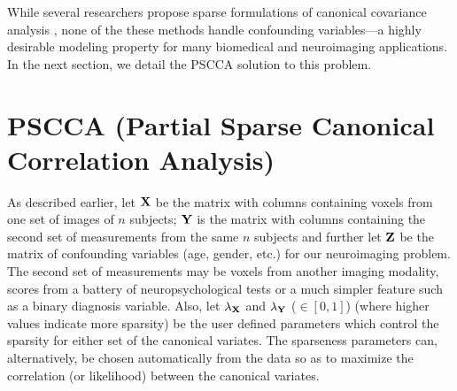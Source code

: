\documentclass{llncs}
\newcommand{\X}{{\bf X}}
\newcommand{\Y}{{\bf Y}}
\newcommand{\Z}{{\bf Z}}
\begin{document}

While several researchers propose sparse formulations of canonical
covariance analysis \cite{parkhomenko,witten,lykou}, none of the these
methods handle confounding variables---a highly desirable modeling
property for many biomedical and neuroimaging applications.  In the
next section, we detail the PSCCA solution to this problem.

\section{PSCCA (Partial Sparse Canonical Correlation Analysis)}
As described earlier, let $\X$ be the matrix with columns containing voxels from one set of
images of $n$ subjects; $\Y$ is the matrix with columns containing
the second set of measurements from the same $n$ subjects and further
let $\Z$ be the matrix of confounding variables (age, gender, etc.) for
our neuroimaging problem.  The second set of measurements may be
voxels from another imaging modality, scores from a battery of
neuropsychological tests or a much simpler feature such as a binary
diagnosis variable.  Also, let $\lambda_{\X}$ and $\lambda_{\Y}$ ($\in
[0,1]$) (where higher values indicate more sparsity) be the user defined 
parameters which control the sparsity for either set of the canonical
variates.  The sparseness parameters can, alternatively, be chosen automatically 
from the data so as to maximize the correlation (or likelihood) between the canonical variates.
\end{document}
